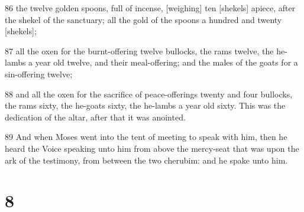 \par 86 the twelve golden spoons, full of incense, [weighing] ten [shekels] apiece, after the shekel of the sanctuary; all the gold of the spoons a hundred and twenty [shekels];
\par 87 all the oxen for the burnt-offering twelve bullocks, the rams twelve, the he-lambs a year old twelve, and their meal-offering; and the males of the goats for a sin-offering twelve;
\par 88 and all the oxen for the sacrifice of peace-offerings twenty and four bullocks, the rams sixty, the he-goats sixty, the he-lambs a year old sixty. This was the dedication of the altar, after that it was anointed.
\par 89 And when Moses went into the tent of meeting to speak with him, then he heard the Voice speaking unto him from above the mercy-seat that was upon the ark of the testimony, from between the two cherubim: and he spake unto him.

\chapter{8}

